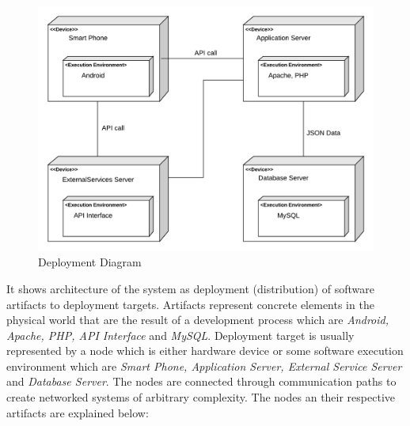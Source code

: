\begin{figure}[H]
	\begin{center}
		\includegraphics[width=\textwidth]{./DD_Diagrams/Deployment.png}
      \caption{Deployment Diagram}
        \label{TrackMe_depdia}
	\end{center}
\end{figure}
It shows architecture of the system as deployment (distribution) of software artifacts to deployment targets. Artifacts represent concrete elements in the physical world that are the result of a development process which are \textit{Android, Apache, PHP, API Interface} and \textit{MySQL}. Deployment target is usually represented by a node which is either hardware device or some software execution environment which are \textit{Smart Phone, Application Server, External Service Server} and \textit{Database Server}. The nodes are connected through communication paths to create networked systems of arbitrary complexity.\newline
The nodes an their respective artifacts are explained below:
